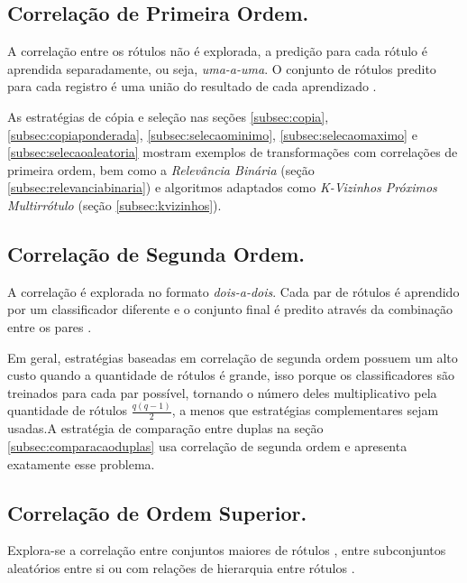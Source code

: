 \documentclass[runningheads,a4paper]{llncs}
\begin{document}
\subsection{Correlação de Primeira Ordem.} \label{subsec:corr1ordem}

A correlação entre os rótulos não é explorada, a predição para cada rótulo é aprendida separadamente, ou seja, \emph{uma-a-uma}. O conjunto de rótulos predito para cada registro é uma união do resultado de cada aprendizado \cite{De_Carvalho2009-yp}.

As estratégias de cópia e seleção nas seções \ref{subsec:copia}, \ref{subsec:copiaponderada}, \ref{subsec:selecaominimo}, \ref{subsec:selecaomaximo} e \ref{subsec:selecaoaleatoria} mostram exemplos de transformações com correlações de primeira ordem, bem como a \textit{Relevância Binária} (seção \ref{subsec:relevanciabinaria}) e algoritmos adaptados como \textit{K-Vizinhos Próximos Multirrótulo} (seção \ref{subsec:kvizinhos}).

\subsection{Correlação de Segunda Ordem.} \label{subsec:corr2ordem}

A correlação é explorada no formato \emph{dois-a-dois}. Cada par de rótulos é aprendido por um classificador diferente e o conjunto final é predito através da combinação entre os pares \cite{Hullermeier2008-co}.

Em geral, estratégias baseadas em correlação de segunda ordem possuem um alto custo quando a quantidade de rótulos é grande, isso porque os classificadores são treinados para cada par possível, tornando o número deles multiplicativo pela quantidade de rótulos $\frac{q (q - 1)}{2}$, a menos que estratégias complementares sejam usadas.A estratégia de comparação entre duplas na seção \ref{subsec:comparacaoduplas} usa correlação de segunda ordem e apresenta exatamente esse problema.

\subsection{Correlação de Ordem Superior.} \label{subsec:corrSordem}

Explora-se a correlação entre conjuntos maiores de rótulos \cite{Read2008-bt}, entre subconjuntos aleatórios entre si \cite{Tsoumakas2007-cw} ou com relações de hierarquia entre rótulos \cite{Cesa-Bianchi2006-fk}.
\end{document}
